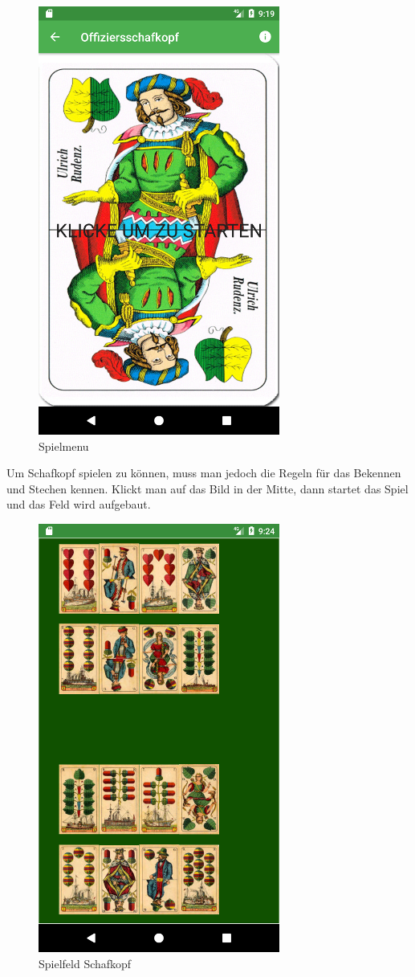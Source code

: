 \begin{figure}[h]
	\centering
	\includegraphics{resources/kartenscreens/menu}
	\caption{Spielmenu}
	\label{fig:gm_uml}
\end{figure}
Um Schafkopf spielen zu können, muss man jedoch die Regeln für das Bekennen und Stechen kennen. Klickt man auf das Bild in der Mitte, dann startet das Spiel und  das Feld wird aufgebaut. 
\begin{figure}[h]
	\centering
	\includegraphics{resources/kartenscreens/board}
	\caption{Spielfeld Schafkopf}
	\label{fig:gm_uml}
\end{figure}
